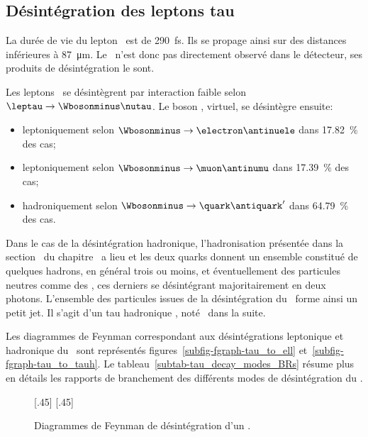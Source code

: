 \subsection{Désintégration des leptons tau}\label{chapter-MS-MSSM-section-pheno_Higgs_MSSM-subsec-desintegration_lepton_tau}
La durée de vie du lepton \tau\ est de \SI{290}{\femto\second}. Ils se propage ainsi sur des distances inférieures à \SI{87}{\micro\meter}.
Le \tau\ n'est donc pas directement observé dans le détecteur, ses produits de désintégration le sont.
\par Les leptons \tau\ se désintègrent par interaction faible selon $\leptau\to\Wbosonminus\nutau$.
Le boson \Wboson, virtuel, se désintègre ensuite:
\begin{itemize}
\item leptoniquement selon $\Wbosonminus\to\electron\antinuele$ dans \SI{17.82}{\%} des cas;
\item leptoniquement selon $\Wbosonminus\to\muon\antinumu$ dans \SI{17.39}{\%} des cas;
\item hadroniquement selon $\Wbosonminus\to\quark\antiquark'$ dans \SI{64.79}{\%} des cas.
\end{itemize}
\par Dans le cas de la désintégration hadronique, l'hadronisation présentée dans la section~ du chapitre~ a lieu et les deux quarks donnent un ensemble constitué de quelques hadrons, en général trois ou moins, et éventuellement des particules neutres comme des \pionnull, ces derniers se désintégrant majoritairement en deux photons.
L'ensemble des particules issues de la désintégration du \Wboson\ forme ainsi un petit jet.
Il s'agit d'un \og tau hadronique \fg, noté \tauh\ dans la suite.
\par Les diagrammes de Feynman correspondant aux désintégrations leptonique et hadronique du \tau\ sont représentés figures~\ref{subfig-fgraph-tau_to_ell} et~\ref{subfig-fgraph-tau_to_tauh}.
Le tableau~\ref{subtab-tau_decay_modes_BRs} résume plus en détails les rapports de branchement des différents modes de désintégration du \tau.
\begin{figure}[h]
\centering
\vspace{\baselineskip}
[.45\textwidth]
{\vspace{\baselineskip}}
\hfill
{}[.45\textwidth]
{\vspace{\baselineskip}}
\caption{Diagrammes de Feynman de désintégration d'un \leptau.}
\label{fig-fgraph-tau_to_ell_and_tauh}
\end{figure}
